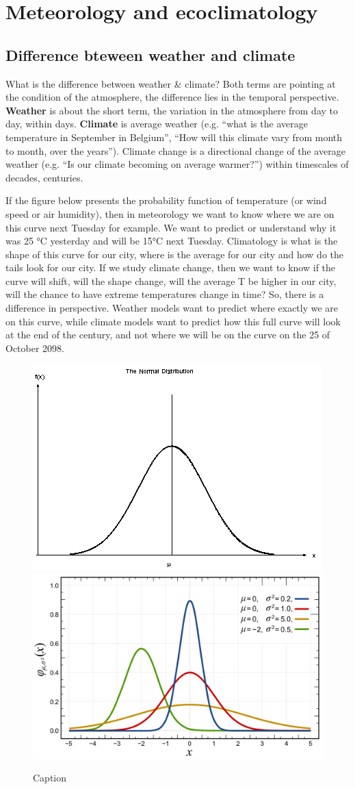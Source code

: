 \documentclass[12pt,oneside]{book}
\begin{document}
\section{Meteorology and
ecoclimatology}\label{meteorology-and-ecoclimatology}

\subsection{Difference bteween weather and
climate}\label{difference-bteween-weather-and-climate}

What is the difference between weather \& climate? Both terms are
pointing at the condition of the atmosphere, the difference lies in the
temporal perspective. \textbf{Weather} is about the short term, the
variation in the atmosphere from day to day, within days.
\textbf{Climate} is average weather (e.g. ``what is the average
temperature in September in Belgium'', ``How will this climate vary from
month to month, over the years''). Climate change is a directional
change of the average weather (e.g. ``Is our climate becoming on average
warmer?'') within timescales of decades, centuries.

If the figure below presents the probability function of temperature (or
wind speed or air humidity), then in meteorology we want to know where
we are on this curve next Tuesday for example. We want to predict or
understand why it was 25 °C yesterday and will be 15°C next Tuesday.
Climatology is what is the shape of this curve for our city, where is
the average for our city and how do the tails look for our city. If we
study climate change, then we want to know if the curve will shift, will
the shape change, will the average T be higher in our city, will the
chance to have extreme temperatures change in time? So, there is a
difference in perspective. Weather models want to predict where exactly
we are on this curve, while climate models want to predict how this full
curve will look at the end of the century, and not where we will be on
the curve on the 25 of October 2098.

\begin{figure}

{\centering \includegraphics[width=0.4\linewidth]{figures/Figure16a} \includegraphics[width=0.4\linewidth]{figures/Figure16b} 

}

\caption{Caption}\label{fig:Climatedef}
\end{figure}
\end{document}
